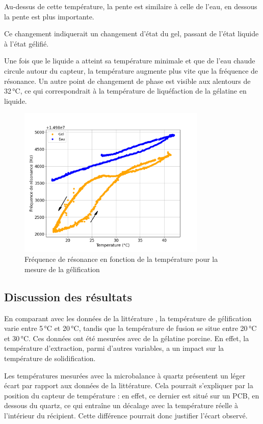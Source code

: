 Au-dessus de cette température, la pente est similaire à celle de l'eau, en dessous la pente est plus importante.  

Ce changement indiquerait un changement d'état du gel, passant de l'état liquide à l'état gélifié.

Une fois que le liquide a atteint sa température minimale et que de l'eau chaude circule autour du capteur, la température augmente plus vite que la fréquence de résonance. Un autre point de changement de phase est visible aux alentours de 32 °C, ce qui correspondrait à la température de liquéfaction de la gélatine en liquide.

\begin{figure}[H]
    \centering
    \includegraphics[width=0.8\textwidth]{assets/figures/gel.png}
    \caption{Fréquence de résonance en fonction de la température pour la mesure de la gélification}
    \label{fig:Frequence gelification}
\end{figure}

\subsection{Discussion des résultats}

En comparant avec les données de la littérature \cite{SHA2019163}, la température de gélification varie entre 5 °C et 20 °C, tandis que la température de fusion se situe entre 20 °C et 30 °C. Ces données ont été mesurées avec de la gélatine porcine. En effet, la température d’extraction, parmi d’autres variables, a un impact sur la température de solidification.

Les températures mesurées avec la microbalance à quartz présentent un léger écart par rapport aux données de la littérature. Cela pourrait s’expliquer par la position du capteur de température : en effet, ce dernier est situé sur un PCB, en dessous du quartz, ce qui entraîne un décalage avec la température réelle à l’intérieur du récipient. Cette différence pourrait donc justifier l’écart observé.


